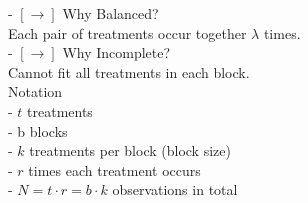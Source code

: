 \documentclass[11pt,a4paper]{article}
\begin{document}
- $[\rightarrow]$ Why Balanced?\\
Each pair of treatments occur together $\lambda$ times.\\
- $[\rightarrow]$ Why Incomplete?\\
Cannot fit all treatments in each block.\\

Notation\\
- $t$ treatments\\
- b blocks\\
- $k$ treatments per block (block size)\\
- $r$ times each treatment occurs\\
- $N=t \cdot r=b \cdot k$ observations in total\\
\end{document}
